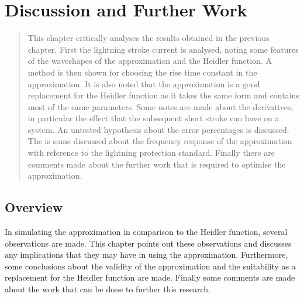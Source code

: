 
\chapter{Discussion and Further Work} %

\label{ChapterDiscussion} %


\begin{quote}
This chapter critically analyses the results obtained in the previous chapter. First the lightning stroke current is analysed, noting some features of the waveshapes of the approximation and the Heidler function. A method is then shown for choosing the rise time constant in the approximation. It is also noted that the approximation is a good replacement for the Heidler function as it takes the same form and contains most of the same parameters. Some notes are made about the derivatives, in particular the effect that the subsequent short stroke can have on a system. An untested hypothesis about the error percentages is discussed. The is some discussed about the frequency response of the approximation with reference to the lightning protection standard. Finally there are comments made about the further work that is required to optimise the approximation.
\end{quote}


\section{Overview}
\label{sec:discussion_overview}
In simulating the approximation in comparison to the Heidler function, several observations are made. This chapter points out these observations and discusses any implications that they may have in using the approximation. Furthermore, some conclusions about the validity of the approximation and the suitability as a replacement for the Heidler function are made. Finally some comments are made about the work that can be done to further this research.

